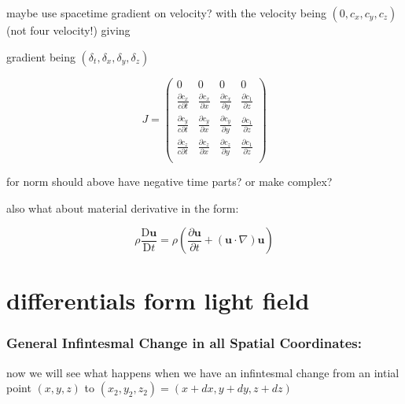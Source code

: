 maybe use spacetime gradient on velocity? with the velocity being $( 0 , c_x , c_y , c_z )$ (not four velocity!) giving

gradient being $( \delta_t , \delta_x , \delta_y , \delta_z )$

\begin{equation}
    J =
    \begin{pmatrix}
        0 & 0 & 0 & 0 \\
        \frac{\partial c_x}{c \partial t} & \frac{\partial c_x}{\partial x} & \frac{\partial c_x}{\partial y} & \frac{\partial c_1}{\partial z} \\
        \frac{\partial c_y}{c \partial t} & \frac{\partial c_y}{\partial x} & \frac{\partial c_y}{\partial y} & \frac{\partial c_1}{\partial z} \\
        \frac{\partial c_z}{c \partial t} & \frac{\partial c_z}{\partial x} & \frac{\partial c_z}{\partial y} & \frac{\partial c_1}{\partial z} \\
    \end{pmatrix}
\end{equation}

for norm should above have negative time parts? or make complex?

also what about material derivative in the form:

\begin{equation}
    \rho {\frac {\mathrm {D} \mathbf {u} }{\mathrm {D} t}}=\rho \left({\frac {\partial \mathbf {u} }{\partial t}}+(\mathbf {u} \cdot \nabla )\mathbf {u} \right)
\end{equation}

\chapter{differentials form light field}\label{ch: differentials form light field}

\subsection{General Infintesmal Change in all Spatial Coordinates:}


now we will see what happens when we have an infintesmal change from an intial point $(x,y,z)$ to $(x_2,y_2,z_2)=(x +dx,y+dy,z+dz)$


